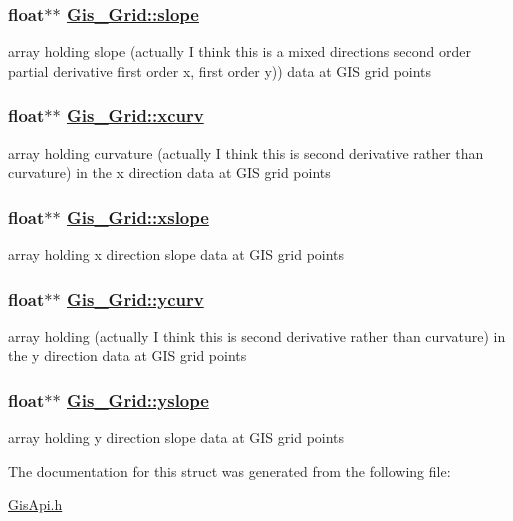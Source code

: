 \hypertarget{structGis__Grid_o4}{
\subsubsection[slope]{\setlength{\rightskip}{0pt plus 5cm}float$\ast$$\ast$ \hyperlink{structGis__Grid_o4}{Gis\_\-Grid::slope}}}
\label{structGis__Grid_o4}


array holding slope (actually I think this is a mixed directions second order partial derivative first order x, first order y)) data at GIS grid points 

\hypertarget{structGis__Grid_o5}{
\subsubsection[xcurv]{\setlength{\rightskip}{0pt plus 5cm}float$\ast$$\ast$ \hyperlink{structGis__Grid_o5}{Gis\_\-Grid::xcurv}}}
\label{structGis__Grid_o5}


array holding curvature (actually I think this is second derivative rather than curvature) in the x direction data at GIS grid points 

\hypertarget{structGis__Grid_o2}{
\subsubsection[xslope]{\setlength{\rightskip}{0pt plus 5cm}float$\ast$$\ast$ \hyperlink{structGis__Grid_o2}{Gis\_\-Grid::xslope}}}
\label{structGis__Grid_o2}


array holding x direction slope data at GIS grid points 

\hypertarget{structGis__Grid_o6}{
\subsubsection[ycurv]{\setlength{\rightskip}{0pt plus 5cm}float$\ast$$\ast$ \hyperlink{structGis__Grid_o6}{Gis\_\-Grid::ycurv}}}
\label{structGis__Grid_o6}


array holding (actually I think this is second derivative rather than curvature) in the y direction data at GIS grid points 

\hypertarget{structGis__Grid_o3}{
\subsubsection[yslope]{\setlength{\rightskip}{0pt plus 5cm}float$\ast$$\ast$ \hyperlink{structGis__Grid_o3}{Gis\_\-Grid::yslope}}}
\label{structGis__Grid_o3}


array holding y direction slope data at GIS grid points 



The documentation for this struct was generated from the following file:\begin{CompactItemize}
\item 
\hyperlink{GisApi_8h}{Gis\-Api.h}\end{CompactItemize}

